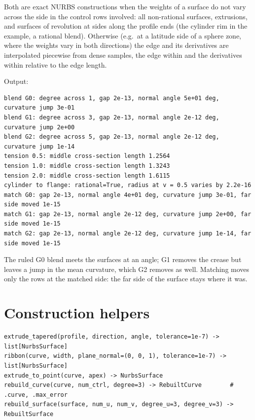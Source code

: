 Both are exact NURBS constructions when the weights of a surface do not vary across the side
in the control rows involved: all non-rational surfaces, extrusions, and surfaces of revolution
at sides along the profile ends (the cylinder rim in the example, a rational blend). Otherwise
(e.g.\ at a latitude side of a sphere zone, where the weights vary in both directions) the edge
and its derivatives are interpolated piecewise from dense samples, the edge within
 and the derivatives within  relative to the edge length.


Output:

\begin{lstlisting}[style=text]
blend G0: degree across 1, gap 2e-13, normal angle 5e+01 deg, curvature jump 3e-01
blend G1: degree across 3, gap 2e-13, normal angle 2e-12 deg, curvature jump 2e+00
blend G2: degree across 5, gap 2e-13, normal angle 2e-12 deg, curvature jump 1e-14
tension 0.5: middle cross-section length 1.2564
tension 1.0: middle cross-section length 1.3243
tension 2.0: middle cross-section length 1.6115
cylinder to flange: rational=True, radius at v = 0.5 varies by 2.2e-16
match G0: gap 2e-13, normal angle 4e+01 deg, curvature jump 3e-01, far side moved 1e-15
match G1: gap 2e-13, normal angle 2e-12 deg, curvature jump 2e+00, far side moved 1e-15
match G2: gap 2e-13, normal angle 2e-12 deg, curvature jump 1e-14, far side moved 1e-15
\end{lstlisting}

The ruled G0 blend meets the surfaces at an angle; G1 removes the crease but leaves a jump in
the mean curvature, which G2 removes as well. Matching moves only the rows at the matched side:
the far side of the surface stays where it was.

\section{Construction helpers}\label{sec:surface-tools}

\begin{lstlisting}[style=text]
extrude_tapered(profile, direction, angle, tolerance=1e-7) -> list[NurbsSurface]
ribbon(curve, width, plane_normal=(0, 0, 1), tolerance=1e-7) -> list[NurbsSurface]
extrude_to_point(curve, apex) -> NurbsSurface
rebuild_curve(curve, num_ctrl, degree=3) -> RebuiltCurve        # .curve, .max_error
rebuild_surface(surface, num_u, num_v, degree_u=3, degree_v=3) -> RebuiltSurface
\end{lstlisting}

